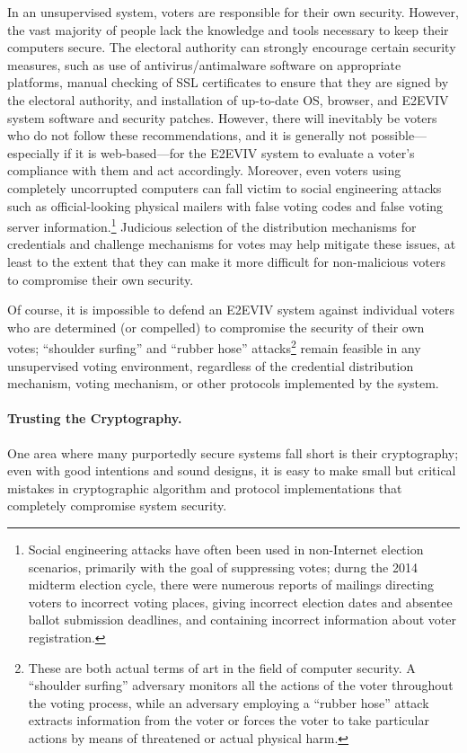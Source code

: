In an unsupervised system, voters are responsible for their own
security. However, the vast majority of people lack the knowledge and
tools necessary to keep their computers secure. The electoral
authority can strongly encourage certain security measures, such as
use of antivirus/antimalware software on appropriate platforms, manual
checking of SSL certificates to ensure that they are signed by the
electoral authority, and installation of up-to-date OS, browser, and
E2EVIV system software and security patches. However, there will
inevitably be voters who do not follow these recommendations, and it
is generally not possible---especially if it is web-based---for the
E2EVIV system to evaluate a voter's compliance with them and act
accordingly.  Moreover, even voters using completely uncorrupted
computers can fall victim to social engineering attacks such as
official-looking physical mailers with false voting codes and false
voting server information.\footnote{Social engineering attacks have
  often been used in non-Internet election scenarios, primarily with
  the goal of suppressing votes; durng the 2014 midterm election
  cycle, there were numerous reports of mailings directing voters to
  incorrect voting places, giving incorrect election dates and
  absentee ballot submission deadlines, and containing incorrect
  information about voter registration.}  Judicious selection of the
distribution mechanisms for credentials and challenge mechanisms for
votes may help mitigate these issues, at least to the extent that they
can make it more difficult for non-malicious voters to compromise
their own security.

Of course, it is impossible to defend an E2EVIV system against
individual voters who are determined (or compelled) to compromise the
security of their own votes; ``shoulder surfing'' and ``rubber hose''
attacks\footnote{These are both actual terms of art in the field of
  computer security. A ``shoulder surfing'' adversary monitors all the
  actions of the voter throughout the voting process, while an
  adversary employing a ``rubber hose'' attack extracts information
  from the voter or forces the voter to take particular actions by
  means of threatened or actual physical harm.} remain feasible in any
unsupervised voting environment, regardless of the credential
distribution mechanism, voting mechanism, or other protocols
implemented by the system.

\paragraph{Trusting the Cryptography.} One area where many purportedly
secure systems fall short is their cryptography; even with good
intentions and sound designs, it is easy to make small but critical
mistakes in cryptographic algorithm and protocol implementations that
completely compromise system security.

